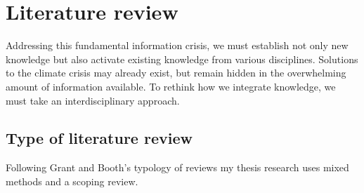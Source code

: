 
\chapter{Literature review}
Addressing this fundamental information crisis, we must establish not only new knowledge but also activate existing knowledge from various disciplines. Solutions to the climate crisis may already exist, but remain hidden in the overwhelming amount of information available. To rethink how we integrate knowledge, we must take an interdisciplinary approach.

\section{Type of literature review}
Following Grant and Booth’s typology of reviews \citep[p. 91-108]{grant_typology_2009} my thesis research uses mixed methods and a scoping review.

